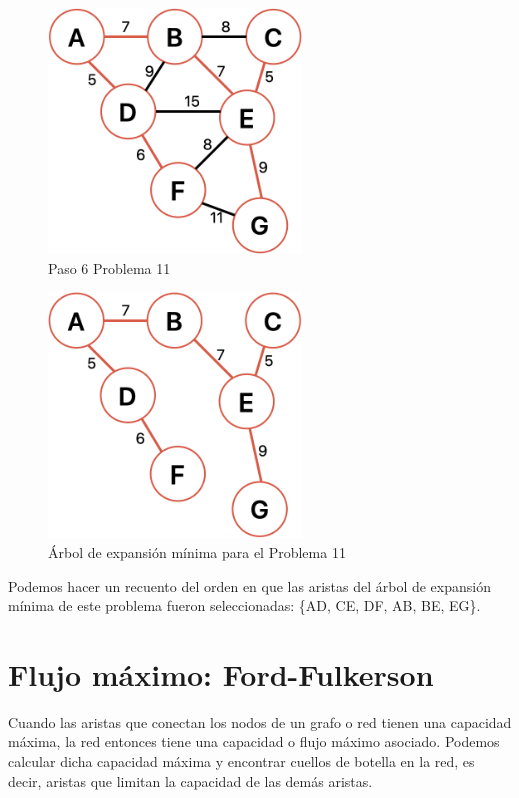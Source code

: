 \documentclass[12pt]{article}  %
\begin{document}
\begin{figure}[H]
\centering
\caption{Paso 6 Problema 11}
\label{fig:paso6Prob11}
\includegraphics[width=0.6\textwidth]{assets/paso6Prob11.png}
\end{figure}

\begin{figure}[H]
\centering
\caption{Árbol de expansión mínima para el Problema 11}
\label{fig:solProb11}
\includegraphics[width=0.6\textwidth]{assets/solProb11.png}
\end{figure}

Podemos hacer un recuento del orden en que las aristas del árbol de expansión mínima de este problema fueron seleccionadas: \{AD, CE, DF, AB, BE, EG\}.

\section{Flujo máximo: Ford-Fulkerson}
Cuando las aristas que conectan los nodos de un grafo o red tienen una capacidad máxima, la red entonces tiene una capacidad o flujo máximo asociado. Podemos calcular dicha capacidad máxima y encontrar cuellos de botella en la red, es decir, aristas que limitan la capacidad de las demás aristas.
\end{document}
